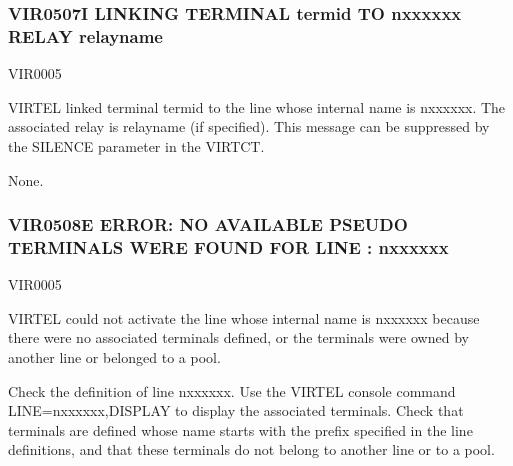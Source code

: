 \documentclass[letterpaper,10pt,english]{sphinxmanual}
\begin{document}
\subsubsection{VIR0507I LINKING TERMINAL termid TO n\sphinxhyphen{}xxxxxx RELAY relayname}
\label{\detokenize{messages:vir0507i-linking-terminal-termid-to-n-xxxxxx-relay-relayname}}\begin{description}
\sphinxAtStartPar
VIR0005

\sphinxAtStartPar
VIRTEL linked terminal termid to the line whose internal name is n\sphinxhyphen{}xxxxxx. The associated relay is relayname (if specified). This message can be suppressed by the SILENCE parameter in the VIRTCT.

\sphinxAtStartPar
None.

\end{description}


\subsubsection{VIR0508E ERROR: NO AVAILABLE PSEUDO TERMINALS WERE FOUND FOR LINE : n\sphinxhyphen{}xxxxxx}
\label{\detokenize{messages:vir0508e-error-no-available-pseudo-terminals-were-found-for-line-n-xxxxxx}}\begin{description}
\sphinxAtStartPar
VIR0005

\sphinxAtStartPar
VIRTEL could not activate the line whose internal name is n\sphinxhyphen{}xxxxxx because there were no associated terminals defined, or the terminals were owned by another line or belonged to a pool.

\sphinxAtStartPar
Check the definition of line n\sphinxhyphen{}xxxxxx. Use the VIRTEL console command LINE=n\sphinxhyphen{}xxxxxx,DISPLAY to display the associated terminals. Check that terminals are defined whose name starts with the prefix specified in the line definitions, and that these terminals do not belong to another line or to a pool.

\end{description}
\end{document}
